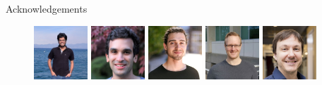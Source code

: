 \documentclass[mathserif,notheorems, hyperref={colorlinks, citecolor=blue, urlcolor=blue, linkcolor=blue}]{beamer}
\begin{document}
    \begin{frame}{Acknowledgements}
     
        \begin{figure}
            \centering
            \includegraphics[width=0.18\textwidth]{collaborators/sharan}
            \includegraphics[width=0.18\textwidth]{collaborators/issam}
            \includegraphics[width=0.18\textwidth]{collaborators/gauthier}
            \includegraphics[width=0.18\textwidth]{collaborators/mark}
            \includegraphics[width=0.18\textwidth]{collaborators/simon}

            \vspace{0.4ex}%


\end{figure}
\end{frame}
\end{document}
